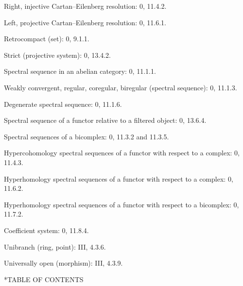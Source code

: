 \documentclass[oneside]{amsart}
\makeatletter
\theoremstyle{ega-env-style}
\theoremstyle{ega-thm-env-style}
\theoremstyle{ega-defn-env-style}
\def\section{\@startsection{section}{1}%
  \z@{.7\linespacing\@plus\linespacing}{.5\linespacing}%
  {\normalfont\bfseries\Large\scshape\centering}}
\newcommand{\oldpage}[2][]{{\marginnote{\normalfont{\textbf{#1}~|~#2}}}\ignorespaces}
\makeatother
\begin{document}
\begin{flushleft}
Right, injective Cartan--Eilenberg resolution: 0, 11.4.2.

Left, projective Cartan--Eilenberg resolution: 0, 11.6.1.

Retrocompact (set): 0, 9.1.1.

Strict (projective system): 0, 13.4.2.

Spectral sequence in an abelian category: 0, 11.1.1.

Weakly convergent, regular, coregular, biregular (spectral sequence):
0, 11.1.3.

Degenerate spectral sequence: 0, 11.1.6.

Spectral sequence of a functor relative to a filtered object: 0, 13.6.4.

Spectral sequences of a bicomplex: 0, 11.3.2 and 11.3.5.

Hypercohomology spectral sequences of a functor with respect to a complex:
0, 11.4.3.

Hyperhomology spectral sequences of a functor with respect to a complex:
0, 11.6.2.

Hyperhomology spectral sequences of a functor with respect to a bicomplex:
0, 11.7.2.

Coefficient system: 0, 11.8.4.

Unibranch (ring, point): III, 4.3.6.

Universally open (morphism): III, 4.3.9.
\end{flushleft}

\clearpage
\oldpage[III]{165}
\section*{TABLE OF CONTENTS}
\end{document}
